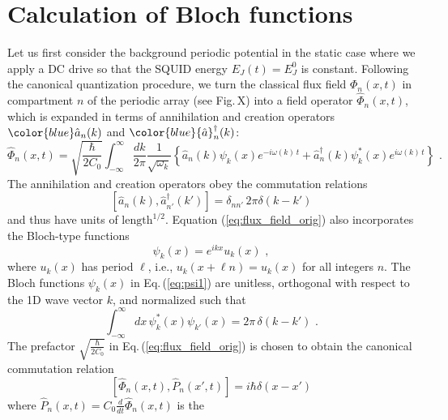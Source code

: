 \chapter{Calculation of Bloch functions}\label{ch:appendix_bloch}
%
\noindent
Let us first consider the background periodic potential in the static case where we apply a DC drive so that the SQUID energy $E_J(t) = E_J^0$ is constant. Following the canonical quantization procedure, 
\color{blue} we turn the classical flux field ${\Phi}_n(x,t)$ 
in compartment $n$ of the periodic array \color{red} (see Fig.\,X) \color{blue}
into a field operator $\hat{\Phi}_n(x,t)$, which is expanded in terms of 
annihilation and creation operators $\color{blue} \hat{a}_n(k)$ and 
$\color{blue} {\hat a}_n^\dagger(k)$:
%
\begin{equation} \label{eq:flux_field_orig}
    \hat{\Phi}_n(x,t) = \sqrt{\frac{\hbar}{2 C_0}} 
    \int_{-\infty}^{\infty}\frac{dk}{2 \pi} \frac{1}{\sqrt{\omega_k}}
    \left\{ \hat{a}_n(k) \psi_k(x)e^{-i \omega(k) \, t} + 
    \hat{a}_n^{\dagger}(k) \psi_k^*(x) e^{i \omega(k) \, t} \right\} \, \, .
\end{equation}
%
The annihilation and creation operators obey the commutation relations
%
\begin{equation} \label{eq:cra_orig}
    \left[ \hat{a}_n(k),{\hat a}_{n'}^\dagger(k') \right] = \delta_{nn'} \, 2 \pi \delta(k - k')
\end{equation}
%
and thus have units of $\text{length}^{1/2}$.
Equation (\ref{eq:flux_field_orig}) also incorporates the Bloch-type functions 
%
\begin{equation} \label{eq:psi1}
\psi_k(x) = e^{i k x} u_k(x) \, \, ,   
\end{equation}
%
where $u_k(x)$ has period $\ell$, i.e., $u_k(x + \ell n) = u_k(x)$ for all integers $n$.
The Bloch functions $\psi_k(x)$ in Eq.\,(\ref{eq:psi1}) are unitless, orthogonal with respect to 
the 1D wave vector $k$, and normalized such that
%
\begin{equation} \label{eq:psi1_norm_orig}
\int_{-\infty}^{\infty} dx \, \psi^*_k(x) \psi_{k'}(x) = 2 \pi \, \delta(k - k') \, \, .
\end{equation}
%
The prefactor $\displaystyle{\sqrt{\frac{\hbar}{2 C_0}}}$ in Eq.\,(\ref{eq:flux_field_orig}) is chosen 
to obtain the canonical commutation relation 
%
\begin{equation} \label{eq:commrelphi}
\left[ \hat{\Phi}_n(x,t), \hat{P}_n(x',t) \right] = i \hbar \delta(x-x')
\end{equation}
%
where $\hat{P}_n(x,t) = C_0 \displaystyle{\frac{d}{dt}} \hat{\Phi}_n(x,t)$ is the 
